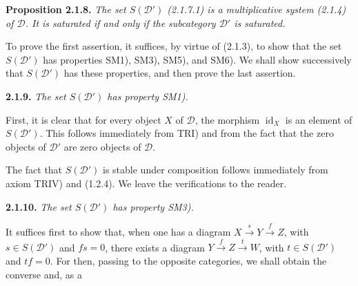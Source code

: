 \medskip
\noindent\textbf{Proposition 2.1.8.}\quad
{}
\emph{The set $S(\mathcal D')$ (2.1.7.1) is a multiplicative system (2.1.4)
of $\mathcal D$. It is saturated if and only if the subcategory
$\mathcal D'$ is saturated.}

To prove the first assertion, it suffices, by virtue of (2.1.3), to show that
the set $S(\mathcal D')$ has properties SM1), SM3), SM5), and SM6). We shall
show successively that $S(\mathcal D')$ has these properties, and then prove
the last assertion.

\medskip
\noindent\textbf{2.1.9.}\quad
{}
\emph{The set $S(\mathcal D')$ has property SM1).}

First, it is clear that for every object $X$ of $\mathcal D$, the morphism
$\operatorname{id}_X$ is an element of $S(\mathcal D')$. This follows
immediately from TRI) and from the fact that the zero objects of $\mathcal D'$
are zero objects of $\mathcal D$.

The fact that $S(\mathcal D')$ is stable under composition follows immediately
from axiom TRIV) and (1.2.4). We leave the verifications to the reader.

\medskip
\noindent\textbf{2.1.10.}\quad
{}
\emph{The set $S(\mathcal D')$ has property SM3).}

It suffices first to show that, when one has a diagram
$X\xrightarrow{s}Y\xrightarrow{f}Z$, with $s\in S(\mathcal D')$ and $fs=0$,
there exists a diagram $Y\xrightarrow{f}Z\xrightarrow{t}W$, with
$t\in S(\mathcal D')$ and $tf=0$. For then, passing to the opposite
categories, we shall obtain the converse and, as a

\endgroup

